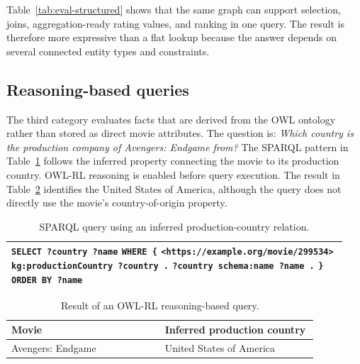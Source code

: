 Table~\ref{tab:eval-structured} shows that the same graph can support
selection, joins, aggregation-ready rating values, and ranking in one
query. The result is therefore more expressive than a flat lookup because
the answer depends on several connected entity types and constraints.

\subsection{Reasoning-based queries}

The third category evaluates facts that are derived from the OWL ontology
rather than stored as direct movie attributes. The question is: \emph{Which
country is the production company of Avengers: Endgame from?} The SPARQL
pattern in Table~\ref{tab:sparql-reasoning} follows the inferred property
connecting the movie to its production country. OWL-RL reasoning is enabled
before query execution. The result in
Table~\ref{tab:eval-reasoning} identifies the United States of America,
although the query does not directly use the movie's country-of-origin
property.

\begin{table}[!htbp]
    \centering
    \caption{SPARQL query using an inferred production-country relation.}
    \label{tab:sparql-reasoning}
    \small
    \begin{tabular}{p{0.94\linewidth}}
        \toprule
        \texttt{SELECT ?country ?name} \newline
        \texttt{WHERE \{} \newline
        \texttt{\quad <https://example.org/movie/299534>} \newline
        \texttt{\quad\quad kg:productionCountry ?country .} \newline
        \texttt{\quad ?country schema:name ?name .} \newline
        \texttt{\}} \newline
        \texttt{ORDER BY ?name} \\
        \bottomrule
    \end{tabular}
\end{table}

\begin{table}[!htbp]
    \centering
    \caption{Result of an OWL-RL reasoning-based query.}
    \label{tab:eval-reasoning}
    \small
    \begin{tabular}{p{0.43\linewidth}p{0.43\linewidth}}
        \toprule
        \textbf{Movie} & \textbf{Inferred production country} \\
        \midrule
        Avengers: Endgame & United States of America \\
        \bottomrule
    \end{tabular}
\end{table}


